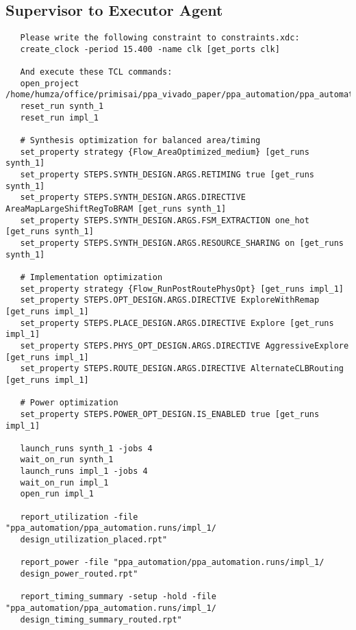 \subsection{Supervisor to Executor Agent}
\vspace{-0.5em}
\begin{supervisorbox}
\begin{lstlisting}
   Please write the following constraint to constraints.xdc:
   create_clock -period 15.400 -name clk [get_ports clk]
   
   And execute these TCL commands:
   open_project /home/humza/office/primisai/ppa_vivado_paper/ppa_automation/ppa_automation.xpr
   reset_run synth_1
   reset_run impl_1
   
   # Synthesis optimization for balanced area/timing
   set_property strategy {Flow_AreaOptimized_medium} [get_runs synth_1]
   set_property STEPS.SYNTH_DESIGN.ARGS.RETIMING true [get_runs synth_1]
   set_property STEPS.SYNTH_DESIGN.ARGS.DIRECTIVE AreaMapLargeShiftRegToBRAM [get_runs synth_1]
   set_property STEPS.SYNTH_DESIGN.ARGS.FSM_EXTRACTION one_hot [get_runs synth_1]
   set_property STEPS.SYNTH_DESIGN.ARGS.RESOURCE_SHARING on [get_runs synth_1]
   
   # Implementation optimization
   set_property strategy {Flow_RunPostRoutePhysOpt} [get_runs impl_1]
   set_property STEPS.OPT_DESIGN.ARGS.DIRECTIVE ExploreWithRemap [get_runs impl_1]
   set_property STEPS.PLACE_DESIGN.ARGS.DIRECTIVE Explore [get_runs impl_1]
   set_property STEPS.PHYS_OPT_DESIGN.ARGS.DIRECTIVE AggressiveExplore [get_runs impl_1]
   set_property STEPS.ROUTE_DESIGN.ARGS.DIRECTIVE AlternateCLBRouting [get_runs impl_1]
   
   # Power optimization
   set_property STEPS.POWER_OPT_DESIGN.IS_ENABLED true [get_runs impl_1]
   
   launch_runs synth_1 -jobs 4
   wait_on_run synth_1
   launch_runs impl_1 -jobs 4
   wait_on_run impl_1
   open_run impl_1
   
   report_utilization -file "ppa_automation/ppa_automation.runs/impl_1/
   design_utilization_placed.rpt"
   
   report_power -file "ppa_automation/ppa_automation.runs/impl_1/
   design_power_routed.rpt"
   
   report_timing_summary -setup -hold -file "ppa_automation/ppa_automation.runs/impl_1/
   design_timing_summary_routed.rpt"
\end{lstlisting}
\end{supervisorbox}

